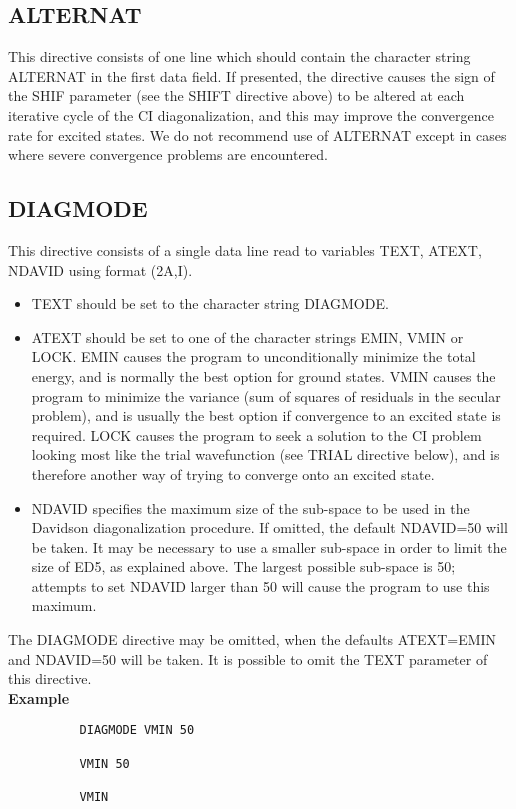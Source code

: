 \documentclass[11pt,fleqn]{article}
\begin{document}
\subsection[ALTERNAT]{ALTERNAT} 

 This directive consists of one line which should contain the
character string ALTERNAT in the first data field. If presented,
the directive causes the sign of the SHIF parameter (see
the SHIFT directive above) to be altered at each iterative cycle
of the CI diagonalization, and this may improve the convergence
rate for excited states. We do not recommend use of ALTERNAT
except in cases where severe convergence problems are encountered.

\subsection[DIAGMODE]{DIAGMODE}

This directive consists of a single data line read to variables
TEXT, ATEXT, NDAVID using format (2A,I).
\begin{itemize}
\item  TEXT should be set to the character string DIAGMODE.
\item  ATEXT should be set to one of the character strings EMIN, VMIN or
LOCK. EMIN causes the program to unconditionally minimize the total
energy, and is normally the best option for ground states.
VMIN causes the program to minimize the variance (sum of squares
of residuals in the secular problem), and is usually the best option if
convergence to an excited state is required.
LOCK causes the program to seek a solution to the CI problem
looking most like the trial wavefunction (see TRIAL directive below),
and is therefore another way of
trying to converge onto an excited state.
\item  NDAVID specifies the maximum size of the sub-space to be used
in the Davidson  diagonalization procedure. If omitted, the default
NDAVID=50 will be taken. It may be necessary to use a smaller
sub-space in order to limit the size of ED5, as explained above.
The largest possible sub-space is 50; attempts to set NDAVID
larger than 50 will cause the program to use this maximum.
\end{itemize}
The DIAGMODE directive may be omitted, when the defaults
ATEXT=EMIN and NDAVID=50 will be taken. It is possible to omit
the TEXT parameter of this directive.\\

{\bf Example}
{
\footnotesize
\begin{verbatim}
          DIAGMODE VMIN 50

          VMIN 50

          VMIN
\end{verbatim}
}
\end{document}
